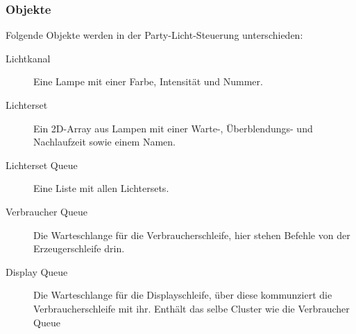 \subsubsection{Objekte}
Folgende Objekte werden in der Party-Licht-Steuerung unterschieden:
\begin{description}
\item[Lichtkanal]Eine Lampe mit einer Farbe, Intensität und Nummer.
\item[Lichterset]Ein 2D-Array aus Lampen mit einer Warte-, Überblendungs- und Nachlaufzeit sowie einem Namen.
\item[Lichterset Queue] Eine Liste mit allen Lichtersets.

\item[Verbraucher Queue]Die Warteschlange für die Verbraucherschleife, hier stehen Befehle von der Erzeugerschleife drin. 



\item[Display Queue]Die Warteschlange für die Displayschleife, über diese kommunziert die Verbraucherschleife mit ihr. Enthält das selbe Cluster wie die Verbraucher Queue

\end{description}


